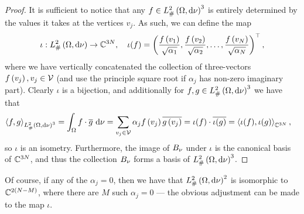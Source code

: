 \begin{proof}
	It is sufficient to notice that any $f\in L^2_{\#}\left( \Omega,\mathrm{d} \nu \right)^3$ is entirely determined by the values it takes at the vertices $v_j$.
	As such, we can define the map
	\begin{align*}
		\iota:L^2_{\#}\left( \Omega,\mathrm{d} \nu \right) \rightarrow \mathbb{C}^{3N}, \quad
		\iota(f) = \left( \frac{f\left( v_1 \right)}{\sqrt{\alpha_1}}, \frac{f\left( v_2 \right)}{\sqrt{\alpha_2}}, \hdots, \frac{f\left( v_N \right)}{\sqrt{\alpha_N}} \right)^\top,
	\end{align*}
	where we have vertically concatenated the collection of three-vectors $f\left( v_j \right), v_j\in\mathcal{V}$ 	(and use the principle square root if $\alpha_j$ has non-zero imaginary part).
	Clearly $\iota$ is a bijection, and additionally for $f,g\in L^2_{\#}\left( \Omega,\mathrm{d} \nu \right)^3$ we have that
	\begin{align*}
		\left\langle f , g \right\rangle_{L^2_{\#}\left( \Omega,\mathrm{d} \nu \right)^3} &= \int_{\Omega}f\cdot\overline{g} \ \mathrm{d}\nu
		= \sum_{v_j\in\mathcal{V}}\alpha_j f\left( v_j \right)\overline{g\left( v_j \right)}
		= \iota(f)\cdot\overline{\iota(g)}
		= \left\langle \iota(f) , \iota(g) \right\rangle_{\mathbb{C}^{3N}},
	\end{align*}
	so $\iota$ is an isometry.
	Furthermore, the image of $B_{\nu}$ under $\iota$ is the canonical basis of $\mathbb{C}^{3N}$, and thus the collection $B_{\nu}$ forms a basis of $L^2_{\#}\left( \Omega,\mathrm{d} \nu \right)^3$.
\end{proof}
Of course, if any of the $\alpha_j=0$, then we have that $L^2_{\#}\left( \Omega,\mathrm{d} \nu \right)^2$ is isomorphic to $\mathbb{C}^{2(N-M)}$, where there are $M$ such $\alpha_j=0$ --- the obvious adjustment can be made to the map $\iota$.

